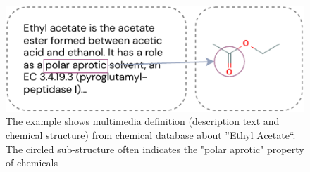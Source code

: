 


\begin{figure}
 	\vskip 0.2in
	\begin{center}
		\centerline{\includegraphics[width=0.9 
			\columnwidth]{intuition.pdf}}
		\caption{The example shows multimedia definition (description text and chemical structure) from chemical database about ''Ethyl Acetate``. The circled sub-structure 
		often indicates the "polar aprotic" property of chemicals}
		\label{fig:intuition}
	\end{center}
 	\vskip -0.2in
\end{figure}



